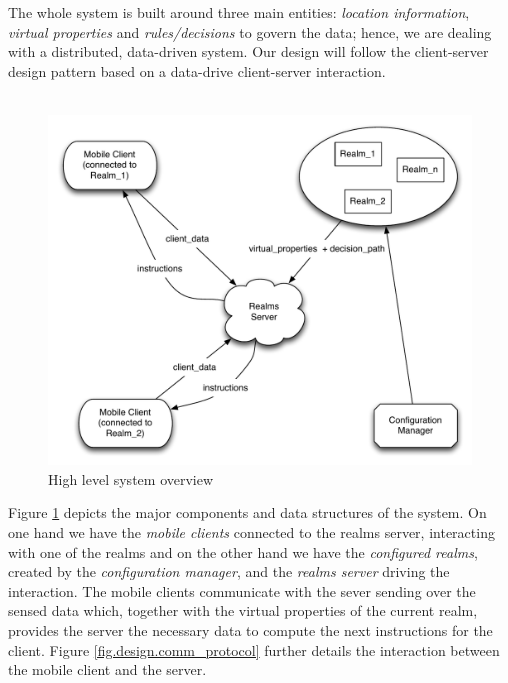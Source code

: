 The whole system is built around three main entities: \emph{location information}, \emph{virtual properties} and \emph{rules/decisions} to govern the data; hence, we are dealing with a distributed, data-driven system. Our design will follow the client-server design pattern based on a data-drive client-server interaction.
\\\\
\begin{figure}
	\centering
	\includegraphics[width=0.9\linewidth]{fig/realms_high_lvl}
	\caption{High level system overview}
	\label{fig.design.high_lvl}
\end{figure}
Figure \ref{fig.design.high_lvl} depicts the major components and data structures of the system. On one hand we have the \emph{mobile clients} connected to the realms server, interacting with one of the realms and on the other hand we have the \emph{configured realms}, created by the \emph{configuration manager}, and the \emph{realms server} driving the interaction. The mobile clients communicate with the sever sending over the sensed data which, together with the virtual properties of the current realm, provides the server the necessary data to compute the next instructions for the client. Figure \ref{fig.design.comm_protocol} further details the interaction between the mobile client and the server.
\\\\
